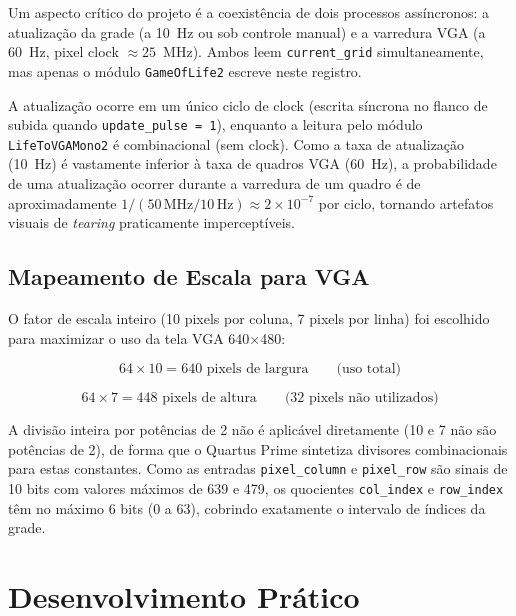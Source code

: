\documentclass[12pt, a4paper]{article}
\begin{document}
	Um aspecto crítico do projeto é a coexistência de dois processos assíncronos:
	a atualização da grade (a 10~Hz ou sob controle manual) e a varredura VGA (a
	60~Hz, pixel clock $\approx 25$~MHz). Ambos leem \texttt{current\_grid}
	simultaneamente, mas apenas o módulo \texttt{GameOfLife2} escreve neste registro.
	
	A atualização ocorre em um único ciclo de clock (escrita síncrona no flanco de
	subida quando \texttt{update\_pulse = 1}), enquanto a leitura pelo módulo
	\texttt{LifeToVGAMono2} é combinacional (sem clock). Como a taxa de atualização
	(10~Hz) é vastamente inferior à taxa de quadros VGA (60~Hz), a probabilidade de
	uma atualização ocorrer durante a varredura de um quadro é de aproximadamente
	$1/(50\,\text{MHz} / 10\,\text{Hz}) \approx 2 \times 10^{-7}$ por ciclo, tornando
	artefatos visuais de \textit{tearing} praticamente imperceptíveis.
	
	\subsection{Mapeamento de Escala para VGA}
	
	O fator de escala inteiro (10 pixels por coluna, 7 pixels por linha) foi escolhido
	para maximizar o uso da tela VGA 640$\times$480:
	
	\begin{equation}
		64 \times 10 = 640 \text{ pixels de largura} \qquad \text{(uso total)}
		\label{eq:escala_h}
	\end{equation}
	
	\begin{equation}
		64 \times 7 = 448 \text{ pixels de altura} \qquad \text{(32 pixels não utilizados)}
		\label{eq:escala_v}
	\end{equation}
	
	A divisão inteira por potências de 2 não é aplicável diretamente (10 e 7 não
	são potências de 2), de forma que o Quartus Prime sintetiza divisores combinacionais
	para estas constantes. Como as entradas \texttt{pixel\_column} e \texttt{pixel\_row}
	são sinais de 10 bits com valores máximos de 639 e 479, os quocientes
	\texttt{col\_index} e \texttt{row\_index} têm no máximo 6 bits ($0$ a $63$),
	cobrindo exatamente o intervalo de índices da grade.
	
	\section{Desenvolvimento Prático}
	\label{sec:pratico}
	
\end{document}
